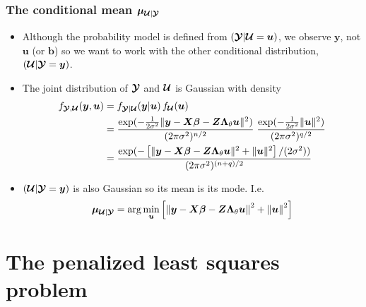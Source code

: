 \documentclass[dvipsnames,pdflatex,beamer]{beamer}
\newcommand{\bLt}{\ensuremath{\bm\Lambda_\theta}}
\begin{document}
\begin{frame}
  \frametitle{The conditional mean $\bm\mu_{\bm{\mathcal{U}}|\bm{\mathcal{Y}}}$}
  \begin{itemize}
  \item Although the probability model is defined from $(\bm{\mathcal{Y}}|\bm{\mathcal{U}}=\bm u)$, we observe $\bm y$, not $\bm u$ (or $\bm b$) so we want
    to work with the other conditional distribution, $(\bm{\mathcal{U}}|\bm{\mathcal{Y}}=\bm
    y)$.
  \item The joint distribution of $\bm{\mathcal{Y}}$ and $\bm{\mathcal{U}}$ is Gaussian
    with density
    \begin{displaymath}
      \begin{aligned}
        f_{\bc Y,\bc U}(\bm y,\bm u)&
        =f_{\bc Y|\bc U}(\bm y|\bm u)\,f_{\bc U}(\bm u)\\
        &=\frac{\exp(-\frac{1}{2\sigma^2}\|\bm y-\bm X\bm\beta-\bm Z\bLt\bm u\|^2)}
        {(2\pi\sigma^2)^{n/2}}\;
        \frac{\exp(-\frac{1}{2\sigma^2}\|\bm u\|^2)}{(2\pi\sigma^2)^{q/2}}\\
        &=\frac{\exp(-
          \left[\|\bm y-\bm X\bm\beta-\bm Z\bLt\bm u\|^2+\|\bm u\|^2\right]/(2\sigma^2))}
        {(2\pi\sigma^2)^{(n+q)/2}}
      \end{aligned}
    \end{displaymath}
  \item $(\bm{\mathcal{U}}|\bm{\mathcal{Y}}=\bm y)$ is also Gaussian so its mean is its mode. I.e.
    \begin{displaymath}
      \bm\mu_{\bc U|\bc Y}=\arg\min_{\bm u}
      \left[\left\|\bm y-\bm X\bm\beta-\bm Z\bLt\bm u\right\|^2 +
      \left\|\bm u\right\|^2\right]
    \end{displaymath}
  \end{itemize}
\end{frame}

\section[PLS]{The penalized least squares problem}
\end{document}
